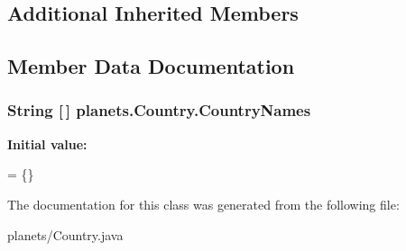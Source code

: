 \subsection*{Additional Inherited Members}


\subsection{Member Data Documentation}
\subsubsection[{\texorpdfstring{Country\+Names}{CountryNames}}]{\setlength{\rightskip}{0pt plus 5cm}String \mbox{[}$\,$\mbox{]} planets.\+Country.\+Country\+Names\hspace{0.3cm}{\ttfamily [static]}}\hypertarget{classplanets_1_1_country_abf0206ff4026808391860c92f92757c5}{}\label{classplanets_1_1_country_abf0206ff4026808391860c92f92757c5}
{\bfseries Initial value\+:}
\begin{DoxyCode}
= 
    \{\}
\end{DoxyCode}


The documentation for this class was generated from the following file\+:\begin{DoxyCompactItemize}
\item 
planets/Country.\+java\end{DoxyCompactItemize}
